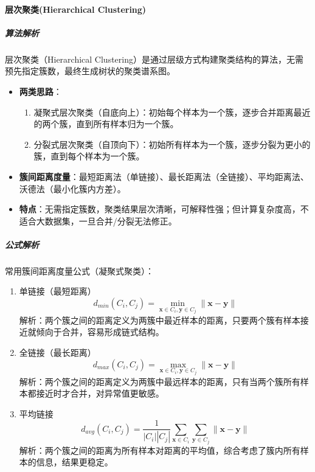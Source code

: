 \documentclass[12pt]{article}
\begin{document}
\paragraph{层次聚类(Hierarchical Clustering)}
\subparagraph{算法解析}
层次聚类（Hierarchical Clustering）是通过层级方式构建聚类结构的算法，无需预先指定簇数，最终生成树状的聚类谱系图。
\begin{itemize}
    \item \textbf{两类思路}：
    \begin{enumerate}
        \item 凝聚式层次聚类（自底向上）：初始每个样本为一个簇，逐步合并距离最近的两个簇，直到所有样本归为一个簇。
        \item 分裂式层次聚类（自顶向下）：初始所有样本为一个簇，逐步分裂为更小的簇，直到每个样本为一个簇。
    \end{enumerate}
    \item \textbf{簇间距离度量}：最短距离法（单链接）、最长距离法（全链接）、平均距离法、沃德法（最小化簇内方差）。
    \item \textbf{特点}：无需指定簇数，聚类结果层次清晰，可解释性强；但计算复杂度高，不适合大数据集，一旦合并/分裂无法修正。
\end{itemize}

\subparagraph{公式解析}
常用簇间距离度量公式（凝聚式聚类）：
\begin{enumerate}
    \item 单链接（最短距离）
    \[
    d_{min}(C_i, C_j) = \min_{\boldsymbol{x} \in C_i, \boldsymbol{y} \in C_j} \|\boldsymbol{x} - \boldsymbol{y}\|
    \]
    解析：两个簇之间的距离定义为两簇中最近样本的距离，只要两个簇有样本接近就倾向于合并，容易形成链式结构。

    \item 全链接（最长距离）
    \[
    d_{max}(C_i, C_j) = \max_{\boldsymbol{x} \in C_i, \boldsymbol{y} \in C_j} \|\boldsymbol{x} - \boldsymbol{y}\|
    \]
    解析：两个簇之间的距离定义为两簇中最远样本的距离，只有当两个簇所有样本都接近时才合并，对异常值更敏感。

    \item 平均链接
    \[
    d_{avg}(C_i, C_j) = \frac{1}{|C_i||C_j|} \sum_{\boldsymbol{x} \in C_i} \sum_{\boldsymbol{y} \in C_j} \|\boldsymbol{x} - \boldsymbol{y}\|
    \]
    解析：两个簇之间的距离为所有样本对距离的平均值，综合考虑了簇内所有样本的信息，结果更稳定。
\end{enumerate}
\end{document}
